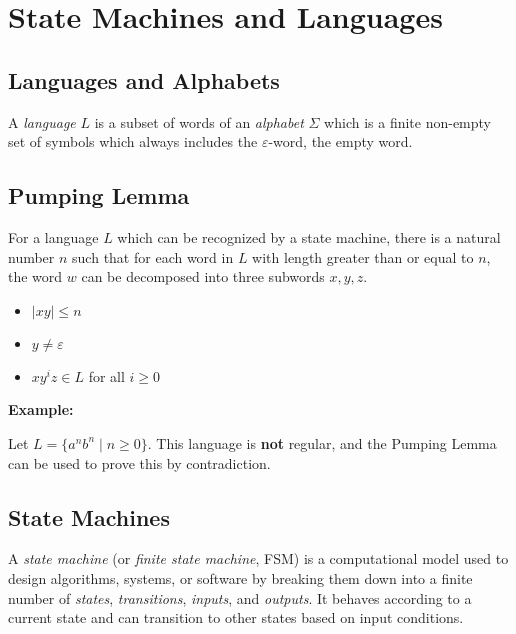 \newpage
\section{State Machines and Languages}

\subsection{Languages and Alphabets}

A \emph{language} \(L\) is a subset of words of an \emph{alphabet} \(\Sigma\) which is a finite 
non-empty set of symbols which always includes the \(\varepsilon\)-word, the empty word.

\subsection{Pumping Lemma}

For a language \(L\) which can be recognized by a state machine, there is a natural number \(n\) such 
that for each word in \(L\) with length greater than or equal to \(n\), the word \(w\) can be decomposed 
into three subwords \(x, y, z\).

\begin{itemize}
    
    \item \(|xy| \leq n\)
    
    \item \(y \neq \varepsilon\)
    
    \item \(xy^i z \in L\) for all \(i \geq 0\)

\end{itemize}

\textbf{Example:}

Let \(L = \{ a^n b^n \mid n \geq 0 \}\). This language is \textbf{not} regular, and the Pumping 
Lemma can be used to prove this by contradiction.

\subsection{State Machines}

A \emph{state machine} (or \emph{finite state machine}, FSM) is a computational model used to 
design algorithms, systems, or software by breaking them down into a finite number of \emph{states}, 
\emph{transitions}, \emph{inputs}, and \emph{outputs}. It behaves according to a current state and can 
transition to other states based on input conditions.

